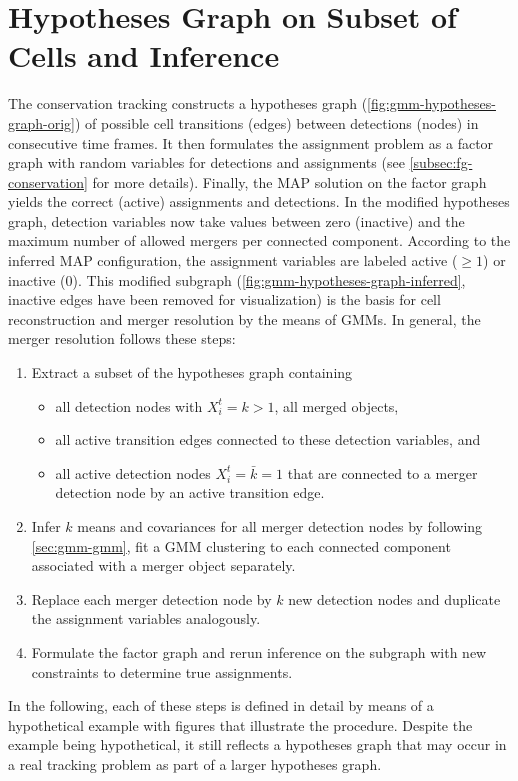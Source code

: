 \section{Hypotheses Graph on Subset of Cells and Inference}
\label{sec:gmm-hypotheses}
The conservation tracking constructs a hypotheses graph (\cref{fig:gmm-hypotheses-graph-orig}) of
possible cell transitions (edges) between detections (nodes) in consecutive time frames. It then
formulates the assignment problem as a factor graph with random variables for detections and
assignments (see \cref{subsec:fg-conservation} for more details). Finally, the MAP solution on the
factor graph yields the correct (active) assignments and detections. In the modified hypotheses
graph, detection variables now take values between zero (inactive) and the maximum number of allowed
mergers per connected component. According to the inferred MAP configuration, the assignment
variables are labeled active ($\ge 1$) or inactive ($0$). This modified subgraph
(\cref{fig:gmm-hypotheses-graph-inferred}, inactive edges have been removed for visualization) is
the basis for cell reconstruction and merger resolution by the means of GMMs. In general, the merger
resolution follows these steps:
\begin{enumerate}
      \item Extract a subset of the hypotheses graph containing
    \begin{itemize}
          \item all detection nodes with $X_i^t = k > 1$, \ie all merged objects,
          \item all active transition edges connected to these detection variables, and
          \item all active detection nodes $X_i^t = \bar{k} = 1$ that are connected to a merger
        detection node by an active transition edge.
    \end{itemize}
      \item Infer $k$ means and covariances for all merger detection nodes by following
    \cref{sec:gmm-gmm}, \ie fit a GMM clustering to each connected component associated with a merger
    object separately.
      \item Replace each merger detection node by $k$ new detection nodes and duplicate the
    assignment variables analogously.
      \item Formulate the factor graph and rerun inference on the subgraph with new constraints to
    determine true assignments.
\end{enumerate}
In the following, each of these steps is defined in detail by means of a hypothetical example with
figures that illustrate the procedure. Despite the example being hypothetical, it still reflects a
hypotheses graph that may occur in a real tracking problem as part of a larger hypotheses graph.

